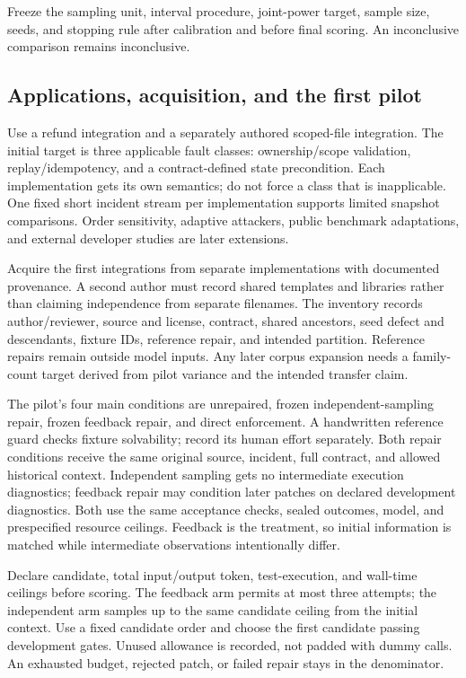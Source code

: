 \documentclass[11pt,a4paper]{article}
\begin{document}
Freeze the sampling unit, interval procedure, joint-power target, sample size, seeds, and stopping rule after calibration and before final scoring. An inconclusive comparison remains inconclusive.

\subsection{Applications, acquisition, and the first pilot}
Use a refund integration and a separately authored scoped-file integration. The initial target is three applicable fault classes: ownership/scope validation, replay/idempotency, and a contract-defined state precondition. Each implementation gets its own semantics; do not force a class that is inapplicable. One fixed short incident stream per implementation supports limited snapshot comparisons. Order sensitivity, adaptive attackers, public benchmark adaptations, and external developer studies are later extensions.

Acquire the first integrations from separate implementations with documented provenance. A second author must record shared templates and libraries rather than claiming independence from separate filenames. The inventory records author/reviewer, source and license, contract, shared ancestors, seed defect and descendants, fixture IDs, reference repair, and intended partition. Reference repairs remain outside model inputs. Any later corpus expansion needs a family-count target derived from pilot variance and the intended transfer claim.

The pilot's four main conditions are unrepaired, frozen independent-sampling repair, frozen feedback repair, and direct enforcement. A handwritten reference guard checks fixture solvability; record its human effort separately. Both repair conditions receive the same original source, incident, full contract, and allowed historical context. Independent sampling gets no intermediate execution diagnostics; feedback repair may condition later patches on declared development diagnostics. Both use the same acceptance checks, sealed outcomes, model, and prespecified resource ceilings. Feedback is the treatment, so initial information is matched while intermediate observations intentionally differ.

Declare candidate, total input/output token, test-execution, and wall-time ceilings before scoring. The feedback arm permits at most three attempts; the independent arm samples up to the same candidate ceiling from the initial context. Use a fixed candidate order and choose the first candidate passing development gates. Unused allowance is recorded, not padded with dummy calls. An exhausted budget, rejected patch, or failed repair stays in the denominator.
\end{document}
